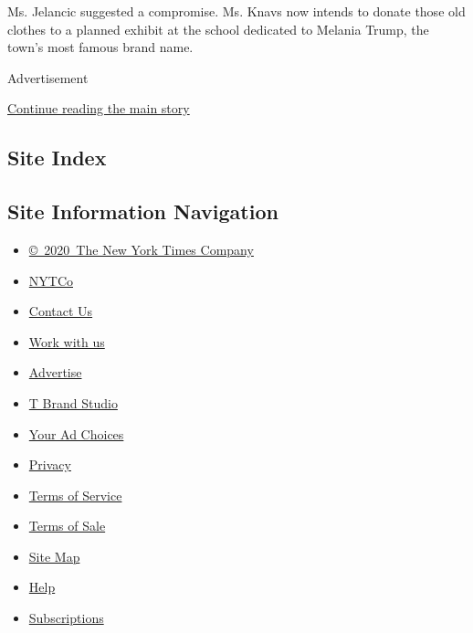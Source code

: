 Ms. Jelancic suggested a compromise. Ms. Knavs now intends to donate
those old clothes to a planned exhibit at the school dedicated to
Melania Trump, the town's most famous brand name.

Advertisement

\protect\hyperlink{after-bottom}{Continue reading the main story}

\hypertarget{site-index}{%
\subsection{Site Index}\label{site-index}}

\hypertarget{site-information-navigation}{%
\subsection{Site Information
Navigation}\label{site-information-navigation}}

\begin{itemize}
\tightlist
\item
  \href{https://help.nytimes.com/hc/en-us/articles/115014792127-Copyright-notice}{©~2020~The
  New York Times Company}
\end{itemize}

\begin{itemize}
\tightlist
\item
  \href{https://www.nytco.com/}{NYTCo}
\item
  \href{https://help.nytimes.com/hc/en-us/articles/115015385887-Contact-Us}{Contact
  Us}
\item
  \href{https://www.nytco.com/careers/}{Work with us}
\item
  \href{https://nytmediakit.com/}{Advertise}
\item
  \href{http://www.tbrandstudio.com/}{T Brand Studio}
\item
  \href{https://www.nytimes.com/privacy/cookie-policy\#how-do-i-manage-trackers}{Your
  Ad Choices}
\item
  \href{https://www.nytimes.com/privacy}{Privacy}
\item
  \href{https://help.nytimes.com/hc/en-us/articles/115014893428-Terms-of-service}{Terms
  of Service}
\item
  \href{https://help.nytimes.com/hc/en-us/articles/115014893968-Terms-of-sale}{Terms
  of Sale}
\item
  \href{https://spiderbites.nytimes.com}{Site Map}
\item
  \href{https://help.nytimes.com/hc/en-us}{Help}
\item
  \href{https://www.nytimes.com/subscription?campaignId=37WXW}{Subscriptions}
\end{itemize}
